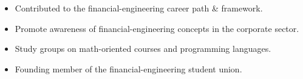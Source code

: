 \documentclass[10pt,a4paper]{altacv}
\begin{document}

\medskip



\begin{itemize}
    \item Contributed to the financial-engineering career path \& framework.
    \item Promote awareness of financial-engineering concepts in the corporate sector.
    \item Study groups on math-oriented courses and programming languages. 
\end{itemize}

\begin{itemize}
    \item Founding member of the financial-engineering student union.
\end{itemize}

\medskip

\clearpage
\end{document}
